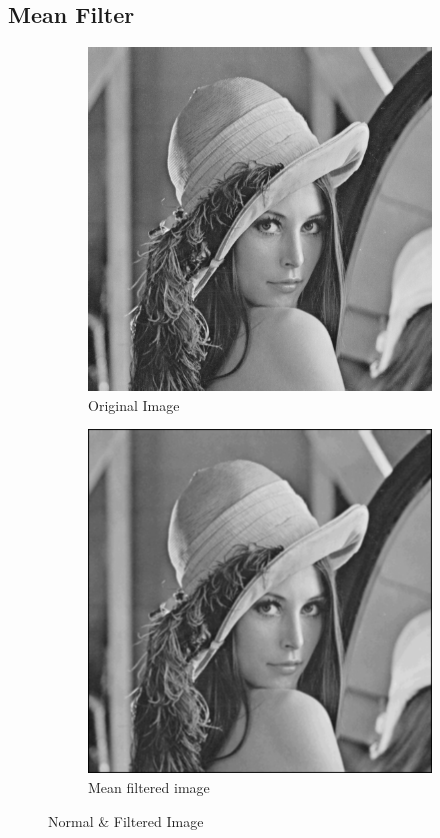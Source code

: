 \documentclass[a4paper,16pt]{article}
\begin{document}
	\subsection{Mean Filter}
	
	\begin{figure}[b!]
		\begin{subfigure}[h]{0.5\linewidth}
			\includegraphics[width=\linewidth]{grayscale}
			\caption{Original Image}
		\end{subfigure}
		\hfill
		\begin{subfigure}[h]{0.5\linewidth}
			\includegraphics[width=\linewidth]{meanfilter}
			\caption{Mean filtered image}
		\end{subfigure}%
		\caption{Normal \& Filtered Image}
	\end{figure}
	\newpage
\end{document}
